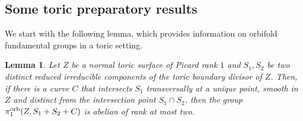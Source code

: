 \documentclass{amsart}
\newtheorem{lemma}[theorem]{Lemma}
\theoremstyle{definition}
\theoremstyle{remark}
\numberwithin{equation}{section}
\begin{document}
\subsection{Some toric preparatory results}

We start with the following lemma, which provides information on orbifold fundamental groups in a toric setting. 

\begin{lemma}\label{lem:toric-fund-group-1}
Let $Z$ be a normal toric surface of Picard rank $1$ and $S_1,S_2$ be two distinct reduced irreducible components of the toric boundary divisor of $Z$. Then, if there is a curve $C$ that intersects $S_1$ transversally at a unique point, smooth in $Z$ and distinct from the intersection point $S_1\cap S_2$, then the group $\pi_1^{\rm orb}(Z,S_1+S_2+C)$ is abelian of rank at most two.
\end{lemma}
\end{document}
